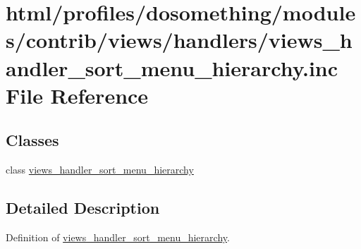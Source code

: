 \hypertarget{views__handler__sort__menu__hierarchy_8inc}{
\section{html/profiles/dosomething/modules/contrib/views/handlers/views\_\-handler\_\-sort\_\-menu\_\-hierarchy.inc File Reference}
\label{views__handler__sort__menu__hierarchy_8inc}
}
\subsection*{Classes}
\begin{DoxyCompactItemize}
\item 
class \hyperlink{classviews__handler__sort__menu__hierarchy}{views\_\-handler\_\-sort\_\-menu\_\-hierarchy}
\end{DoxyCompactItemize}


\subsection{Detailed Description}
Definition of \hyperlink{classviews__handler__sort__menu__hierarchy}{views\_\-handler\_\-sort\_\-menu\_\-hierarchy}. 